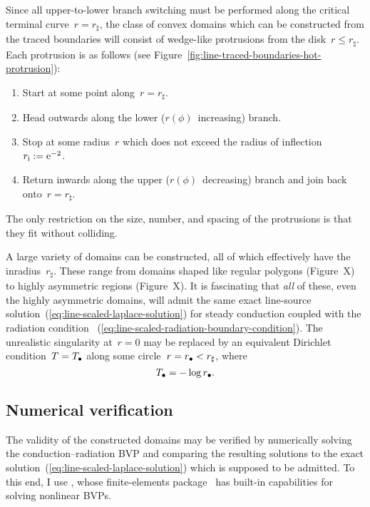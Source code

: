 Since all upper-to-lower branch switching must be performed
along the critical terminal curve~$r = r_\sharp$,
the class of convex domains which can be constructed
from the traced boundaries
will consist of wedge-like protrusions from the disk~$r \le r_\sharp$.
Each protrusion is as follows
(see Figure~\ref{fig:line-traced-boundaries-hot-protrusion}):
\begin{enumerate}
  \item
    Start at some point along~$r = r_\sharp$.
  \item
    Head outwards along the lower ($r (\phi)$~increasing) branch.
  \item
    Stop at some radius~$r$ which does not exceed
    the radius of inflection~$r_{\mathrm{i}} := \mathrm{e}^{-2}$.
  \item
    Return inwards along the upper ($r (\phi)$~decreasing) branch
    and join back onto~$r = r_\sharp$.
\end{enumerate}
The only restriction on the size, number, and spacing of the protrusions
is that they fit without colliding.

A large variety of domains can be constructed,
all of which effectively have the inradius~$r_\sharp$.
These range from domains shaped like regular polygons
(Figure~X) %
to highly asymmetric regions
(Figure~X). %
It is fascinating that \emph{all} of these,
even the highly asymmetric domains,
will admit the same
exact line-source solution~(\ref{eq:line-scaled-laplace-solution})
for steady conduction coupled with the radiation condition~%
  (\ref{eq:line-scaled-radiation-boundary-condition}).
The unrealistic singularity at~$r = 0$
may be replaced by an equivalent Dirichlet condition~$T = T_\bullet$
along some circle~$r = r_\bullet < r_\sharp$,
where
\begin{equation}
  T_\bullet = -\log r_\bullet.
  \label{eq:line-scaled-equivalent-dirichlet-relation}
\end{equation}

\subsection{Numerical verification}
\label{sec:line.convex.verification}

The validity of the constructed domains may be verified
by numerically solving the conduction--radiation BVP
and comparing the resulting solutions
to the exact solution~(\ref{eq:line-scaled-laplace-solution})
which is supposed to be admitted.
To this end, I use ,
whose finite-elements package~
has built-in capabilities for solving nonlinear BVPs.

